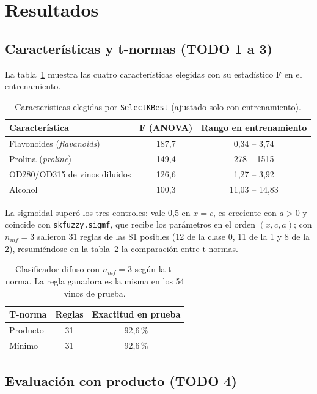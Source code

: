 \documentclass[11pt,letterpaper]{article}
\begin{document}
\section{Resultados}

\subsection{Características y t-normas (TODO 1 a 3)}

La tabla~\ref{tab:caracteristicas} muestra las cuatro características elegidas con su estadístico F en el entrenamiento.

\begin{table}[H]
\centering
\caption{Características elegidas por \texttt{SelectKBest} (ajustado solo con entrenamiento).}\label{tab:caracteristicas}
\begin{tabular}{lcc}
\toprule
Característica & F (ANOVA) & Rango en entrenamiento \\
\midrule
Flavonoides (\textit{flavanoids}) & 187,7 & 0,34 -- 3,74 \\
Prolina (\textit{proline}) & 149,4 & 278 -- 1515 \\
OD280/OD315 de vinos diluidos & 126,6 & 1,27 -- 3,92 \\
Alcohol & 100,3 & 11,03 -- 14,83 \\
\bottomrule
\end{tabular}
\end{table}

La sigmoidal superó los tres controles: vale 0,5 en $x=c$, es creciente con $a>0$ y coincide con \texttt{skfuzzy.sigmf}, que recibe los parámetros en el orden $(x, c, a)$; con $n_{mf}=3$ salieron 31 reglas de las 81 posibles (12 de la clase 0, 11 de la 1 y 8 de la 2), resumiéndose en la tabla~\ref{tab:tnormas} la comparación entre t-normas.

\begin{table}[H]
\centering
\caption{Clasificador difuso con $n_{mf}=3$ según la t-norma. La regla ganadora es la misma en los 54 vinos de prueba.}\label{tab:tnormas}
\begin{tabular}{lcc}
\toprule
T-norma & Reglas & Exactitud en prueba \\
\midrule
Producto & 31 & 92,6\,\% \\
Mínimo & 31 & 92,6\,\% \\
\bottomrule
\end{tabular}
\end{table}

\subsection{Evaluación con producto (TODO 4)}
\end{document}
